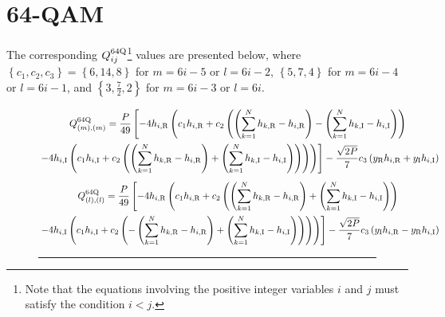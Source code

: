 \section{64-QAM}
The corresponding $Q_{ij}^{64{\rm Q}}$\footnote{Note that the equations involving the positive integer variables \(i\) and \(j\) must satisfy the condition \(i < j\).} values are presented below, where $\left\lbrace c_1, c_2, c_3 \right\rbrace = \left\lbrace 6, 14, 8 \right\rbrace$ for $m = 6i - 5$ or $l = 6i - 2$, $\left\lbrace 5, 7, 4 \right\rbrace$ for $m = 6i - 4$ or $l = 6i - 1$, and $\left\lbrace 3, \frac{7}{2}, 2 \right\rbrace$ for $m = 6i - 3$ or $l = 6i$.
\begin{figure}[H]
	\begin{multline}
		Q_{(m),(m)}^{64{\rm Q}} = \frac{P}{49}
		\left[ -4 h_{i,{\rm R}} 
		\left(
		c_1 h_{i,{\rm R}} + c_2 \left( \left( \sum_{k=1}^{N} h_{k,{\rm R}} - h_{i,{\rm R}} \right) - \left( \sum_{k=1}^{N} h_{k,{\rm I}} - h_{i,{\rm I}} \right) \right)
		\right.
		\right.
		\\
		\left. \left. 
		-4 h_{i,{\rm I}} 
		\left(
		c_1 h_{i,{\rm I}} + c_2 \left( \left( \sum_{k=1}^{N} h_{k,{\rm R}} - h_{i,{\rm R}} \right) 
		+ \left( \sum_{k=1}^{N} h_{k,{\rm I}} - h_{i,{\rm I}} \right) \right)
		\right)
		\right)
		\right]
		- \frac{\sqrt{2 P}}{7} c_3 \left( y_{\rm R} h_{i,{\rm R}} + y_{\rm I} h_{i,{\rm I}}\right)
	\end{multline}
 \vspace{-1cm}
	\begin{multline}
		Q_{(l),(l)}^{64{\rm Q}} = \frac{P}{49}
		\left[ -4 h_{i,{\rm R}} 
		\left(
		c_1 h_{i,{\rm R}} + c_2 \left( \left( \sum_{k=1}^{N} h_{k,{\rm R}} - h_{i,{\rm R}} \right) + \left( \sum_{k=1}^{N} h_{k,{\rm I}} - h_{i,{\rm I}} \right) \right)
		\right.
		\right.
		\\
		\left. \left. 
		-4 h_{i,{\rm I}} 
		\left(
		c_1 h_{i,{\rm I}} + c_2 \left( -\left( \sum_{k=1}^{N} h_{k,{\rm R}} - h_{i,{\rm R}} \right) 
		+ \left( \sum_{k=1}^{N} h_{k,{\rm I}} - h_{i,{\rm I}} \right) \right)
		\right)
		\right)
		\right]
		- \frac{\sqrt{2 P}}{7} c_3 \left( y_{\rm I} h_{i,{\rm R}} - y_{\rm R} h_{i,{\rm I}}\right)
	\end{multline}
	\hrule
\end{figure}
\vspace{-1.5cm}
